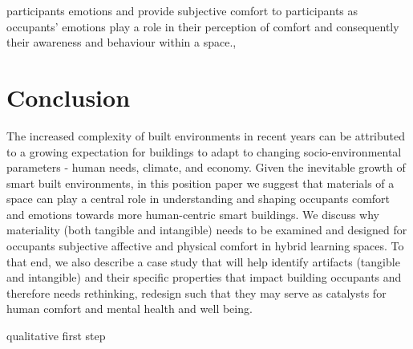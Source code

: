 \documentclass[acmconf, anonymous, review]{acmart}
\begin{document}
participants emotions and provide subjective comfort to participants as occupants' emotions play a role in their perception of comfort and consequently their awareness and behaviour within a space.,





\section{Conclusion}
The increased complexity of built environments in recent years can be attributed to a growing expectation for buildings to adapt to changing socio-environmental parameters - human needs, climate, and economy. Given the inevitable growth of smart built environments, in this position paper we suggest that materials of a space can play a central role in understanding and shaping occupants comfort and emotions towards more human-centric smart buildings. We discuss why materiality (both tangible and intangible) needs to be examined and designed for occupants subjective affective and physical comfort in hybrid learning spaces. To that end, we also describe a case study that will help identify artifacts (tangible and intangible) and their specific properties that impact building occupants and therefore needs rethinking, redesign such that they may serve as catalysts for human comfort and mental health and well being. 

qualitative first step




\end{document}
